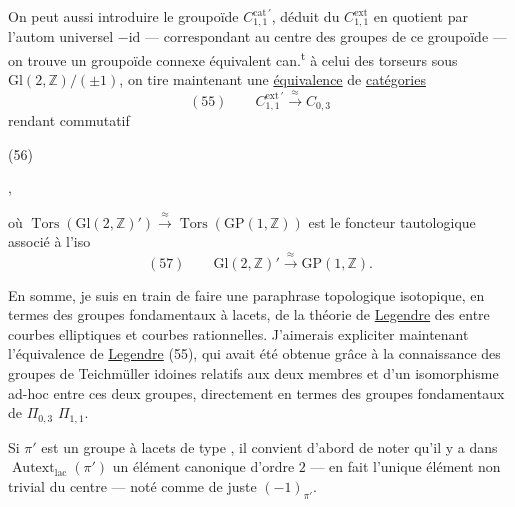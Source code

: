 On peut aussi introduire le groupoïde
$C_{1,1}^{\mathrm{cat}\,\prime}$, déduit du 
$C_{1,1}^{\mathrm{ext}}$ en 
quotient par l'autom universel $-\mathrm{id}$
--- correspondant au centre  des groupes
 de ce groupoïde --- on trouve
un groupoïde connexe équivalent can.\textsuperscript{t}
à celui des torseurs sous 
$\mathrm{Gl}(2,\mathbb Z)/(\pm1)$,
 on tire maintenant une
\uline{équivalence} de \uline{catégories}
\[
(55)\qquad C_{1,1}^{\mathrm{ext}\,\prime}\xrightarrow{\approx}C_{0,3}
\]
rendant commutatif

\begin{samepage}
(56)\quad
{}
\end{samepage},

où $\operatorname{Tors}(\mathrm{Gl}(2,\mathbb Z)')\xrightarrow{\approx}
\operatorname{Tors}(\mathrm{GP}(1,\mathbb Z))$ est
le foncteur tautologique associé à l'iso
\[
(57)\qquad \mathrm{Gl}(2,\mathbb Z)'\xrightarrow{\approx}\mathrm{GP}(1,\mathbb Z).
\]

En somme, je suis en train de faire une
paraphrase topologique isotopique, en termes
des groupes fondamentaux à lacets, de
la théorie de \uline{Legendre} des  entre
courbes elliptiques et courbes rationnelles.
J'aimerais expliciter maintenant l'équivalence
de \uline{Legendre} (55), qui avait
été obtenue grâce à la connaissance des
groupes de Teichmüller idoines relatifs
aux deux membres et d'un isomorphisme
ad-hoc entre ces deux groupes,
directement en termes des groupes
fondamentaux de  $\Pi_{0,3}$  $\Pi_{1,1}$.

Si $\pi'$ est un groupe à lacets de type
, il convient d'abord de noter qu'il
y a dans $\operatorname{Autext}_{\mathrm{lac}}(\pi')$ un élément canonique
d'ordre $2$ --- en fait l'unique élément non trivial
du centre --- noté comme de juste $(-1)_{\pi'}$.

